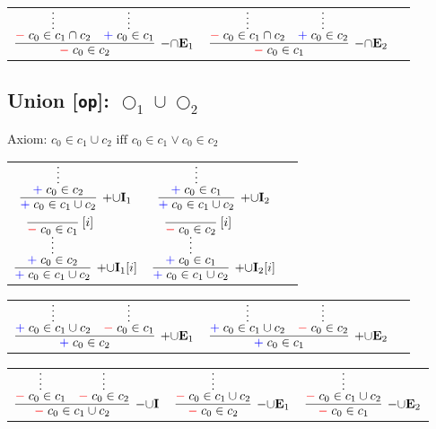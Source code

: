 \documentclass[11pt]{article}
\begin{document}
\noindent
\begin{tabular}{ccc}
$
\infer[\DenyRule{\cap}\Elim{1}]{\Deny{c_0\in c_2}}{
	\infer*{\Deny{c_0\in c_1\cap c_2}}{}
	&
	\infer*{\Assert{c_0\in c_1}}{}
}
$
\hspace{1cm}
&
$
\infer[\DenyRule{\cap}\Elim{2}]{\Deny{c_0\in c_1}}{
	\infer*{\Deny{c_0\in c_1\cap c_2}}{}
	&
	\infer*{\Assert{c_0\in c_2}}{}
}
$
\end{tabular}
\bigskip


\subsection*{Union [\texttt{op}]: $\bigcirc_1\cup\bigcirc_2$}

\smallskip
\noindent
Axiom: $c_0\in c_1\cup c_2\text{ iff }c_0\in c_1\lor c_0\in c_2$
\smallskip

\noindent
\begin{tabular}{ccc}
$
\infer[\AssertRule{\cup}\Intro{1}]{\Assert{c_0\in c_1\cup c_2}}{
	\infer*{\Assert{c_0\in c_2}}{}
}
$
\hspace{1cm}
&
$
\infer[\AssertRule{\cup}\Intro{2}]{\Assert{c_0\in c_1\cup c_2}}{
	\infer*{\Assert{c_0\in c_1}}{}
}
$
\hspace{1cm}
\\[5mm]
$
\infer[\AssertRule{\cup}\Intro{1}{[i]}]{\Assert{c_0\in c_1\cup c_2}}{
	\infer*{\Assert{c_0\in c_2}}{\infer[\Label{i}]{\Deny{c_0\in c_1}}{}}
}
$
\hspace{1cm}
&
$
\infer[\AssertRule{\cup}\Intro{2}{[i]}]{\Assert{c_0\in c_1\cup c_2}}{
	\infer*{\Assert{c_0\in c_1}}{\infer[\Label{i}]{\Deny{c_0\in c_2}}{}}
}
$
\end{tabular}
\bigskip

\noindent
\begin{tabular}{ccc}
$
\infer[\AssertRule{\cup}\Elim{1}]{\Assert{c_0\in c_2}}{
	\infer*{\Assert{c_0\in c_1\cup c_2}}{}
	&
	\infer*{\Deny{c_0\in c_1}}{}
}
$
\hspace{1cm}
&
$
\infer[\AssertRule{\cup}\Elim{2}]{\Assert{c_0\in c_1}}{
	\infer*{\Assert{c_0\in c_1\cup c_2}}{}
	&
	\infer*{\Deny{c_0\in c_2}}{}
}
$
\end{tabular}
\bigskip

\noindent
\begin{tabular}{ccc}
$
\infer[\DenyRule{\cup}\Intro{}]{\Deny{c_0\in c_1\cup c_2}}{
	\infer*{\Deny{c_0\in c_1}}{}
	& 
	\infer*{\Deny{c_0\in c_2}}{}
}
$
\hspace{1cm}
&
$
\infer[\DenyRule{\cup}\Elim{1}]{\Deny{c_0\in c_2}}{
	\infer*{\Deny{c_0\in c_1\cup c_2}}{}
}
$
\hspace{1cm}
&
$
\infer[\DenyRule{\cup}\Elim{2}]{\Deny{c_0\in c_1}}{
	\infer*{\Deny{c_0\in c_1\cup c_2}}{}
}
$
\end{tabular}
\bigskip
\end{document}

